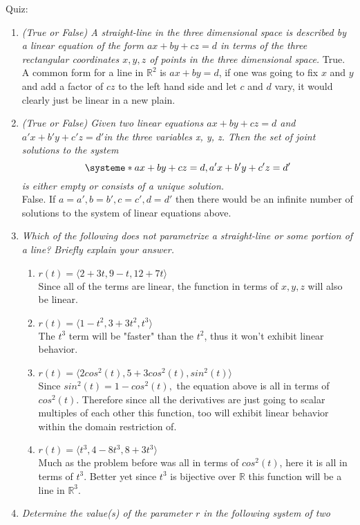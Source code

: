 \documentclass[12pt, letterpaper]{article}
\newcommand{\R}{\mathbb{R}}
\begin{document}
Quiz:
\begin{enumerate}
	\item \textit{(True or False) A straight-line in the three dimensional space is described by
a linear equation of the form $ax+by+cz = d$ in terms of the three rectangular
coordinates $x, y, z$ of points in the three dimensional space.}
	True.  A common form for a line in $\R^2$ is $ax+by=d$, if one was going to fix $x$ and $y$ and add a factor of $cz$ to the left hand side and let $c$ and $d$ vary, it would clearly just be linear in a new plain.  
	\item \textit{(True or False) Given two linear equations $ax+by+cz = d$ and $a'x+b'y+c'z =
d'$in the three variables x, y, z. Then the set of joint solutions to the system \[ \systeme*{ax+by+cz = d, a'x+b'y+c'z =
	d'} \] is either empty or consists of a unique solution. }\\
	False.  If $a=a', b=b', c=c', d=d'$ then there would be an infinite number of solutions to the system of linear equations above. 
	\item \textit{Which of the following does not parametrize a straight-line or some portion
of a line? Briefly explain your answer.}
	\begin{enumerate}
		\item $r(t) = \langle 2+3t, 9-t, 12+7t \rangle$\\
		Since all of the terms are linear, the function in terms of $x,y,z$ will also be linear.
		\item $r(t) = \langle1 - t^2, 3+3t^2, t^3 \rangle$\\
		The $t^3$ term will be "faster" than the $t^2$, thus it won't exhibit linear behavior.
		\item $r(t) = \langle2cos^2(t), 5+3cos^2(t), sin^2(t)\rangle$\\
		Since $sin^2(t) = 1-cos^2(t),$ the equation above is all in terms of $cos^2(t).$  Therefore since all the derivatives are just going to scalar multiples of each other this function, too will exhibit linear behavior within the domain restriction of.
		\item $r(t) = \langle t^3, 4-8t^3, 8+3t^3\rangle$ \\
		Much as the problem before was all in terms of $cos^2(t)$, here it is all in terms of $t^3.$  Better yet since $t^3$ is bijective over $\R$ this function will be a line in $\R^3.$  
	\end{enumerate}
	\item \textit{Determine the value(s) of the parameter $r$ in the following system of two
}
\end{enumerate}
\end{document}
